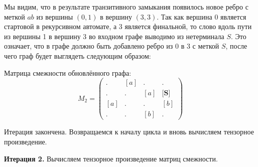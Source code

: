 \begin{example}
Мы видим, что в результате транзитивного замыкания появилось новое ребро с меткой $ab$ из вершины $(0,1)$ в вершину $(3,3)$.
Так как вершина 0 является стартовой в рекурсивном автомате, а 3 является финальной, то слово вдоль пути из вершины 1 в вершину 3 во входном графе выводимо из нетерминала $S$.
Это означает, что в графе должно быть добавлено ребро из $0$ в $3$ с меткой $S$, после чего граф будет выглядеть следующим образом:

\begin{center}
\end{center}

Матрица смежности обновлённого графа:
$$ M_2 =
\begin{pmatrix} 
. & [a] & . & . \\
. & . & [a] & \textbf{[S]} \\
[a] & . & . & [b] \\
. & . & [b] & . 
\end{pmatrix}
$$

Итерация закончена. 
Возвращаемся к началу цикла и вновь вычисляем тензорное произведение.

\textbf{Итерация 2.}
Вычисляем тензорное произведение матриц смежности.


\end{example}
